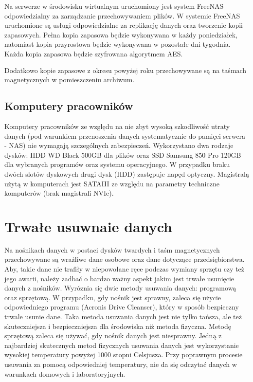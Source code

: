 Na serwerze w środowisku wirtualnym uruchomiony jest system FreeNAS odpowiedzialny za zarządzanie przechowywaniem plików. W systemie FreeNAS uruchomione są usługi odpowiedzialne za replikację danych oraz tworzenie kopii zapasowych. Pełna kopia zapasowa będzie wykonywana w każdy poniedziałek, natomiast kopia przyrostowa będzie wykonywana w pozostałe dni tygodnia. Każda kopia zapasowa będzie szyfrowana algorytmem AES.

Dodatkowo kopie zapasowe z okresu powyżej roku przechowywane są na taśmach magnetycznych w pomieszczeniu archiwum.

\subsection{Komputery pracowników}
Komputery pracowników ze względu na nie zbyt wysoką szkodliwość utraty danych (pod warunkiem przenoszenia danych systematycznie do pamięci serwera - NAS) nie wymagają szczególnych zabezpieczeń. Wykorzystano dwa rodzaje dysków: HDD WD Black 500GB dla plików oraz SSD Samsung 850 Pro 120GB dla wybranych programów oraz systemu operacyjnego. W przypadku braku dwóch slotów dyskowych drugi dysk (HDD) zastępuje napęd optyczny. Magistralą użytą w komputerach jest SATAIII ze względu na parametry techniczne komputerów (brak magistrali NVIe).


\section{Trwałe usuwnaie danych}
Na nośnikach danych w postaci dysków twardych i taśm magnetycznych przechowywane są wrażliwe dane osobowe oraz dane dotyczące przedsiębiorstwa. Aby, takie dane nie trafiły w niepowołane ręce podczas wymiany sprzętu czy też jego awarii, należy zadbać o bardzo ważny aspekt jakim jest trwałe usunięcie danych z nośników. Wyróznia się dwie metody usuwania danych: programową oraz sprzętową. W przypadku, gdy nośnik jest sprawny, zaleca się użycie odpowiedniego programu (Acronis Drive Cleanser), który w sposób bezpieczny trwale usunie dane. Taka metoda usuwania danych jest nie tylko tańsza, ale też skuteczniejsza i bezpieczniejsza dla środowiska niż metoda fizyczna. Metodę sprzętową zaleca się używać, gdy nośnik danych jest niesprawny. Jedną z najbardziej skutecznych metod fizycznych usuwania danych jest wykorzystanie wysokiej temperatury powyżej 1000 stopni Celsjusza. Przy poprawnym procesie usuwania za pomocą odpowiedniej temperatury, nie da się odczytać danych w warunkach domowych i laboratoryjnych.
